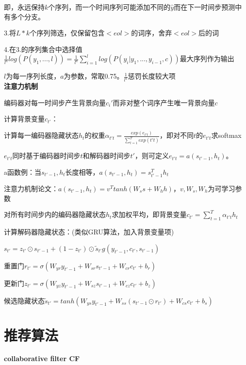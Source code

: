 \documentclass[UTF8]{ctexart}
\begin{document}
  \quad \quad \quad 即，永远保持$k$个序列，而一个时间序列可能添加不同的$\hat{y}$而在下一时间步预测中有多个分支。
  
  \quad \quad 3.将$L*k$个序列筛选，仅保留包含$<eol>$的词序，舍弃$<eol>$后的词
  
  \quad \quad 4.在3.的序列集合中选择值$\frac{1}{l^a}log(P(y_1, ...,l))=\frac{1}{l^a}\sum_{i=1}^llog(P(y_i|y_1, ..., y_{i-1}, c))$最大序列作为输出
  
  \quad \quad \quad $l$为每一序列长度，$a$为参数，常取0.75。$\frac{1}{l^a}$惩罚长度较大项\\
\textbf{注意力机制}

  编码器对每一时间步产生背景向量$c_i'$而非对整个词序产生唯一背景向量$c$

  计算背景变量$c_{t'}$：

  \quad 计算每一编码器隐藏状态$h_t$的权重$\alpha_{t't} = \frac{exp(e_{t't})}{\sum_{t=1}^{T}exp(t't)}$，即对不同$t$的$e_{t't}$求softmax

  \quad \quad $e_{t't}$同时基于编码器时间步$t$和解码器时间步$t'$，则可定义$e_{t't} = a(s_{t'-1}, h_t)$。

  \quad \quad \quad a函数例：当$s_{t'-1}, h_t$长度相等，$a(s_{t'-1}, h_t) = s_{t'-1}^Th_t$

  \quad \quad \quad 注意力机制论文：$a(s_{t'-1}, h_t) = v^Ttanh(W_ss + W_hh)$，$v, W_s, W_h$为可学习参数

  \quad 对所有时间步内的编码器隐藏状态$h_t$求加权平均，即背景变量$c_{t'} = \sum_{t=1}^{T}\alpha_{t't}h_t$

  计算解码器隐藏状态：(类似GRU算法，加入背景变量项)
  
  \quad $s_{t'} = z_{t'} \odot s_{t'-1} + (1-z_{t'}) \odot \tilde{s}_{t'}g(y_{t'-1}, c_{t'}, s_{t'-1})$

  \quad \quad 重置门$r_{t'} = \sigma(W_{yr}y_{t'-1} + W_{sr}s_{t'-1} + W_{cr}c_{t'} + b_r)$
  
  \quad \quad 更新门$z_{t'} = \sigma(W_{yz}y_{t'-1} + W_{sz}s_{t'-1} + W_{cz}c_{t'} + b_z)$

  \quad \quad 候选隐藏状态$\tilde{s}_{t'} = tanh(W_{ys}y_{t'-1} + W_{ss}(s_{t'-1} \odot r_{t'}) + W_{cs}c_{t'} + b_s)$

\section{推荐算法}
\noindent \textbf{collaborative filter CF}
\end{document}
